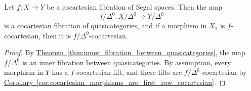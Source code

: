 \documentclass[main.tex]{subfiles}
\begin{document}
\begin{corollary}
  \label{cor:cocart_fib_between_css_gives_cocart_fib_of_quasicats}
  Let $f\colon X \to Y$ be a cocartesian fibration of Segal spaces. Then the map
  \begin{equation*}
    f/\Delta^{0}\colon X/\Delta^{0} \to Y/\Delta^{0}
  \end{equation*}
  is a cocartesian fibration of quasicategories, and if a morphism in $X_{1}$ is $f$-cocartesian, then it is $f / \Delta^{0}$-cocartesian.
\end{corollary}
\begin{proof}
  By \hyperref[thm:inner_fibration_between_quasicategories]{Theorem~\ref*{thm:inner_fibration_between_quasicategories}}, the map $f/\Delta^{0}$ is an inner fibration between quasicategories. By assumption, every morphism in $Y$ has a $f$-cocartesian lift, and these lifts are $f / \Delta^{0}$-cocartesian by  \hyperref[cor:cocartesian_morphisms_are_first_row_cocartesian]{Corollary~\ref*{cor:cocartesian_morphisms_are_first_row_cocartesian}}.
\end{proof}
\end{document}
